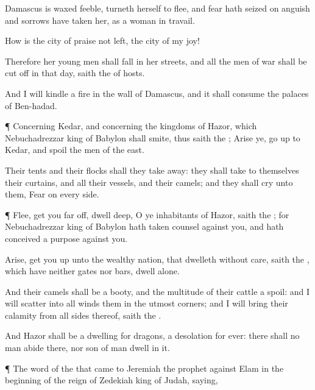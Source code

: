 {Damascus is waxed
feeble,
{}
turneth herself to
flee, and
fear hath
seized on
{}
anguish and
sorrows have
taken her, as a woman in
travail.

How is the
city of
praise not
left, the
city of my
joy!

Therefore her young
men shall
fall in her
streets, and all the
men of
war shall be cut
off in that
day,
saith the
{} of
hosts.

And I will
kindle a
fire in the
wall of
Damascus, and it shall
consume the
palaces of
Ben-hadad.


\par }{\PP {}¶ Concerning
Kedar, and concerning the
kingdoms of
Hazor, which
Nebuchadrezzar
king of
Babylon shall
smite, thus
saith the
{};
Arise ye, go
up to
Kedar, and
spoil the
men of the
east.

Their
tents and their
flocks shall they take
away: they shall
take to themselves their
curtains, and all their
vessels, and their
camels; and they shall
cry unto them,
Fear
{} on every
side.


\par }{\PP {}¶
Flee,
get you far
off,
dwell
deep, O ye
inhabitants of
Hazor,
saith the
{}; for
Nebuchadrezzar
king of
Babylon hath taken
counsel against you, and hath
conceived a
purpose against you.

Arise, get you
up unto the
wealthy
nation, that
dwelleth without
care,
saith the
{}, which have neither
gates nor
bars,
{}
dwell
alone.

And their
camels shall be a
booty, and the
multitude of their
cattle a
spoil: and I will
scatter into all
winds them
{} in the
utmost
corners; and I will
bring their
calamity from all
sides thereof,
saith the
{}.

And
Hazor shall be a
dwelling for
dragons,
{} a
desolation
for
ever: there shall no
man
abide there, nor
{}
son of
man
dwell in it.


\par }{\PP {}¶ The
word of the
{} that came to
Jeremiah the
prophet against
Elam in the
beginning of the
reign of
Zedekiah
king of
Judah,
saying,

}
